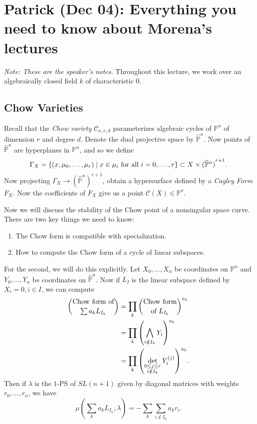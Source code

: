 \documentclass[leqno, openany]{memoir}
\theoremstyle{definition}
\theoremstyle{remark}
\theoremstyle{plain}
\theoremstyle{definition}
\theoremstyle{remark}
\renewcommand{\P}{\mathbb{P}}
\newcommand{\mc}[1]{\mathcal{#1}}
\newcommand{\wh}[1]{\widehat{#1}}
\begin{document}
\chapter{Patrick (Dec 04): Everything you need to know about Morena's lectures}%
\label{cha:patrick_dec_04_}

\textit{Note: These are the speaker's notes.} Throughout this lecture, we work over an algebraically closed field $k$ of characteristic $0$.

\section{Chow Varieties}%
\label{sec:chow_varieties}

Recall that the \textit{Chow variety} $\mc{C}_{n, r, d}$ parameterizes algebraic cycles of $\P^n$ of dimension $r$ and degree $d$. Denote the dual projective space by $\widehat{\P}^n$. Now points of $\widehat{\P}^n$ are hyperplanes in $\P^n$, and so we define
\[ \Gamma_X = \qty{ (x, \mu_0, \ldots, \mu_r) \mid x \in \mu_i \text{ for all } i = 0, \ldots, r } \subset X \times {(\widehat{\P}^n)}^{r+1}. \]
Now projecting $\Gamma_X \to {(\wh{\P}^n)}^{r+1}$, obtain a hypersurface defined by a \textit{Cayley Form} $F_X$. Now the coefficients of $F_X$ give us a point $\mc{C}(X) \in \P^{\nu}$.

Now we will discuss the stability of the Chow point of a nonsingular space curve. There are two key things we need to know:
\begin{enumerate}
    \item The Chow form is compatible with specialization.
    \item How to compute the Chow form of a cycle of linear subspaces.
\end{enumerate}
For the second, we will do this explicitly. Let $X_0, \ldots, X_n$ be coordinates on $\P^n$ and $Y_0, \ldots, Y_n$ be coordinates on $\wh{\P}^n$. Now if $L_I$ is the linear subspace defined by $X_i = 0, i \in I$, we can compute
\begin{align*}
    \binom{\text{Chow form of}}{\sum a_k L_{I_k}} &= \prod_k \binom{\text{Chow form}}{\text{of }L_{I_k}}^{a_k} \\
                                                  &= \prod_k \qty(\bigwedge_{i \notin I_k} Y_i)^{a_k} \\
                                                  &= \prod_k \qty(\det_{\substack{0 \leq j \leq r \\ i \notin I_k}} Y_i^{(j)})^{a_k}.
\end{align*}
Then if $\lambda$ is the $1$-PS of $SL(n+1)$ given by diagonal matrices with weights $r_0, \ldots, r_n$, we have
\[ \mu(\sum_k a_k L_{I_k}, \lambda) = - \sum_k \sum_{i \notin I_k} a_k r_i. \]
\end{document}
